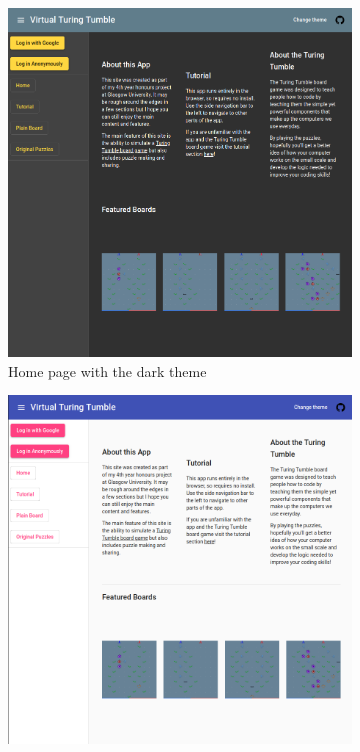 \documentclass{l4proj}
\begin{document}
\begin{appendices}
    \begin{figure}
        \centering
        \begin{subfigure}[b]{0.7\textwidth}
            \includegraphics[width=\textwidth]{images/darkTheme.png}
            \caption{Home page with the dark theme}
            \label{fig:homepageDark}
        \end{subfigure}
        \begin{subfigure}[b]{0.7\textwidth}
            \includegraphics[width=\textwidth]{images/lightTheme.png}

\end{subfigure}
\end{figure}
\end{appendices}
\end{document}
